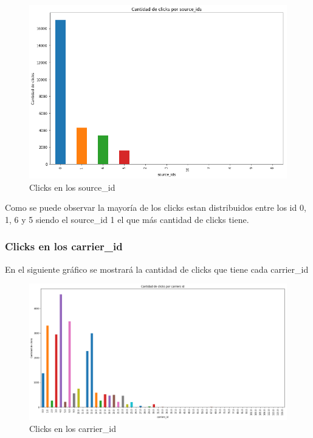 \documentclass[a4paper, 12pt]{article}
\begin{document}
		
		\FloatBarrier
		\begin{figure}[h]
			\centering
			\includegraphics[width=\textwidth]{images/clicks/clicks_source_id.png}
			\caption{Clicks en los source\_id}
		\end{figure}
		\FloatBarrier

		 Como se puede observar la mayoría de los clicks estan distribuidos entre los id 0, 1, 6 y 5 siendo el source\_id 1 el que más cantidad de clicks tiene.


	\subsubsection{Clicks en los carrier\_id}
		 En el siguiente gráfico se mostrará la cantidad de clicks que tiene cada carrier\_id
		
		\FloatBarrier
		\begin{figure}[h]
			\centering
			\includegraphics[width=\textwidth]{images/clicks/clicks_carrier_id.png}
			\caption{Clicks en los carrier\_id}
		\end{figure}
		\FloatBarrier
\end{document}
